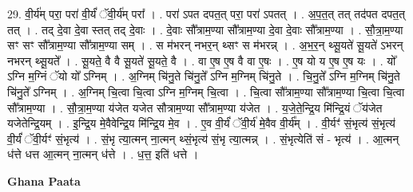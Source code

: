 \documentclass[17pt]{extarticle}
\begin{document}
29. वी॒र्य॑म् परा॒ परा॑ वी॒र्यं॑ ॅवी॒र्य॑म् परा᳚ । . परा॑ ऽपत दपत॒त् परा॒ परा॑ ऽपतत् । . अ॒प॒त॒त् तत् तद॑पत दपत॒त् तत् । . तद् दे॒वा दे॒वा स्तत् तद् दे॒वाः । . दे॒वाः सौ᳚त्राम॒ण्या सौ᳚त्राम॒ण्या दे॒वा दे॒वाः सौ᳚त्राम॒ण्या । . सौ॒त्रा॒म॒ण्या सꣳ सꣳ सौ᳚त्राम॒ण्या सौ᳚त्राम॒ण्या सम् । . स म॑भरन् नभर॒न् थ्सꣳ स म॑भरन्न् । . अ॒भ॒र॒न् थ्सू॒यते॑ सू॒यते॑ ऽभरन् नभरन् थ्सू॒यते᳚ । . सू॒यते॒ वै वै सू॒यते॑ सू॒यते॒ वै । . वा ए॒ष ए॒ष वै वा ए॒षः । . ए॒ष यो य ए॒ष ए॒ष यः । . यो᳚ ऽग्नि म॒ग्निं ॅयो यो᳚ ऽग्निम् । . अ॒ग्निम् चि॑नु॒ते चि॑नु॒ते᳚ ऽग्नि म॒ग्निम् चि॑नु॒ते । . चि॒नु॒ते᳚ ऽग्नि म॒ग्निम् चि॑नु॒ते चि॑नु॒ते᳚ ऽग्निम् । . अ॒ग्निम् चि॒त्वा चि॒त्वा ऽग्नि म॒ग्निम् चि॒त्वा । . चि॒त्वा सौ᳚त्राम॒ण्या सौ᳚त्राम॒ण्या चि॒त्वा चि॒त्वा सौ᳚त्राम॒ण्या । . सौ॒त्रा॒म॒ण्या य॑जेत यजेत सौत्राम॒ण्या सौ᳚त्राम॒ण्या य॑जेत । . य॒जे॒ते॒न्द्रि॒य मि॑न्द्रि॒यं ॅय॑जेत यजेतेन्द्रि॒यम् । . इ॒न्द्रि॒य मे॒वैवेन्द्रि॒य मि॑न्द्रि॒य मे॒व । . ए॒व वी॒र्यं॑ ॅवी॒र्य॑ मे॒वैव वी॒र्य᳚म् । . वी॒र्यꣳ॑ सं॒भृत्य॑ सं॒भृत्य॑ वी॒र्यं॑ ॅवी॒र्यꣳ॑ सं॒भृत्य॑ । . सं॒भृ त्या॒त्मन् ना॒त्मन् थ्सं॒भृत्य॑ सं॒भृ त्या॒त्मन्न् । . सं॒भृत्येति॑ सं - भृत्य॑ । . आ॒त्मन् ध॑त्ते धत्त आ॒त्मन् ना॒त्मन् ध॑त्ते । . ध॒त्त॒ इति॑ धत्ते । \newline

\textbf{Ghana Paata } \newline
\end{document}
